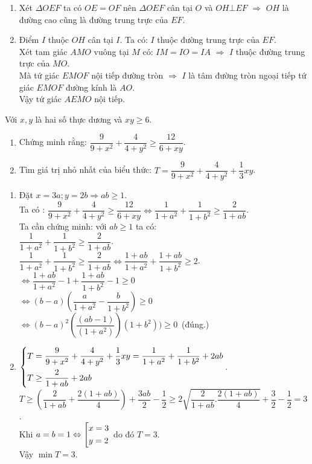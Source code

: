 \begin{ex}
{\begin{enumerate}
$\Rightarrow $ Tứ giác $EMOF$ nội tiếp.
 \item Xét $\Delta OEF$ ta có $OE=OF$ nên $\Delta OEF$ cân tại $O$
và $OH\bot EF$
$\Rightarrow $ $OH$ là đường cao cũng là đường trung trực của $EF$.
	\item  Điểm $I$ thuộc $OH$   cân tại $I$.
Ta có: $I$ thuộc đường trung trực của $EF$.\\
Xét tam giác $AMO$ vuông tại $M$ có: $IM=IO=IA$ $\Rightarrow $ $I$ thuộc đường trung trực của $MO$.\\
Mà tứ giác $EMOF$ nội tiếp đường tròn
$\Rightarrow $ $I$ là tâm đường tròn ngoại tiếp tứ giác $EMOF$ đường kính là $AO$.\\
Vậy tứ giác $AEMO$ nội tiếp.
\end{enumerate}
    }
\end{ex}
\begin{ex}%
    Với $x,y$ là hai số thực dương và $xy\ge 6$.
    \begin{enumerate}
        \item Chứng minh rằng: $\dfrac{9}{9+{{x}^{2}}}+\dfrac{4}{4+{{y}^{2}}}\ge \dfrac{12}{6+xy}$.
        \item Tìm giá trị nhỏ nhất của biểu thức: $T=\dfrac{9}{9+{{x}^{2}}}+\dfrac{4}{4+{{y}^{2}}}+\dfrac{1}{3}xy$.
    \end{enumerate}
\loigiai
    {
    \begin{enumerate}
 \item Đặt $x=3a;y=2b\Rightarrow ab\ge 1$.\\
Ta có : $\dfrac{9}{9+x^2}+\dfrac{4}{4+y^2}\ge \dfrac{12}{6+xy}\Leftrightarrow \dfrac{1}{1+a^2}+\dfrac{1}{1+b^2}\ge \dfrac{2}{1+ab}$.\\
Ta cần chứng minh: với $ab\ge 1$ ta có:\\
$\dfrac{1}{1+a^2}+\dfrac{1}{1+b^2}\ge \dfrac{2}{1+ab}$.\\
$\dfrac{1}{1+a^2}+\dfrac{1}{1+b^2}\ge \dfrac{2}{1+ab}\Leftrightarrow \dfrac{1+ab}{1+a^2}+\dfrac{1+ab}{1+b^2}\ge 2$.\\
$\Leftrightarrow \dfrac{1+ab}{1+a^2}-1+\dfrac{1+ab}{1+b^2}-1\ge 0$\\
$\Leftrightarrow ( b-a)(\dfrac{a}{1+a^2}-\dfrac{b}{1+b^2})\ge 0$\\
$\Leftrightarrow ( b-a)^2(\dfrac{( ab-1)}{(1+a^2)})( 1+b^2))\ge 0$~(đúng.)
 \item $\left\{\begin{aligned}& T=\dfrac{9}{9+x^2}+\dfrac{4}{4+y^2}+\dfrac{1}{3}xy=\dfrac{1}{1+a^2}+\dfrac{1}{1+b^2}+2ab \\
 & T\ge \dfrac{2}{1+ab}+2ab\end{aligned}\right.$.\\
$T\ge(\dfrac{2}{1+ab}+\dfrac{2(1+ab)}{4})+\dfrac{3ab}{2}-\dfrac{1}{2}\ge 2\sqrt{\dfrac{2}{1+ab}.\dfrac{2(1+ab)}{4}}+\dfrac{3}{2}-\dfrac{1}{2}=3$.\\
Khi $a=b=1\Leftrightarrow \left[\begin{aligned}& x=3 \\  &y=2\end{aligned}\right.$ do đó $T=3$.\\
Vậy $\min{T}=3$.
\end{enumerate}
}
\end{ex}
